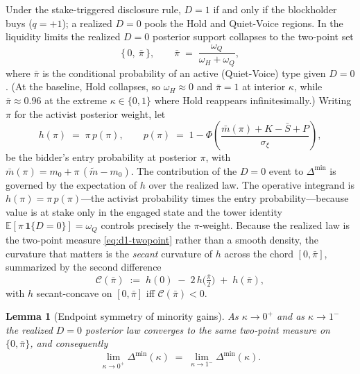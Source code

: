 \documentclass[11pt]{article}
\newtheorem{lemma}{Lemma}
\newcommand{\E}{\mathbb{E}}
\newcommand{\1}{\mathbf{1}}
\begin{document}
Under the stake-triggered disclosure rule, $D=1$ if and only if the blockholder
buys ($q=+1$); a realized $D=0$ pools the Hold and Quiet-Voice regions. In the
liquidity limits the realized $D=0$ posterior support collapses to the two-point
set
\begin{equation}
  \big\{\,0,\ \bar\pi\,\big\},
  \qquad
  \bar\pi \;=\; \frac{\omega_Q}{\omega_H+\omega_Q},
  \label{eq:d1-twopoint}
\end{equation}
where $\bar\pi$ is the conditional probability of an active (Quiet-Voice) type
given $D=0$. (At the baseline, Hold collapses, so $\omega_H\!\approx\!0$ and
$\bar\pi=1$ at interior $\kappa$, while $\bar\pi\approx 0.96$ at the extreme
$\kappa\in\{0,1\}$ where Hold reappears infinitesimally.) Writing $\pi$ for the
activist posterior weight, let
\begin{equation}
  h(\pi)\;=\;\pi\,p(\pi),
  \qquad
  p(\pi)\;=\;1-\Phi\!\left(\frac{\bar m(\pi)+K-\bar S+P}{\sigma_\xi}\right),
  \label{eq:d1-hdef}
\end{equation}
be the bidder's entry probability at posterior $\pi$, with
$\bar m(\pi)=m_0+\pi\,(\tilde m-m_0)$. The contribution of the $D=0$ event to
$\Delta^{\min}$ is governed by the expectation of $h$ over the realized law.
The operative integrand is $h(\pi)=\pi\,p(\pi)$---the activist probability times
the entry probability---because value is at stake only in the engaged state and
the tower identity $\E[\pi\,\1\{D=0\}]=\omega_Q$ controls precisely the
$\pi$-weight. Because the realized law is the two-point measure
\eqref{eq:d1-twopoint} rather than a smooth density, the curvature that matters
is the \emph{secant} curvature of $h$ across the chord $[0,\bar\pi]$, summarized
by the second difference
\begin{equation}
  \mathcal{C}(\bar\pi)
  \;:=\;
  h(0)\;-\;2\,h\!\big(\tfrac{\bar\pi}{2}\big)\;+\;h(\bar\pi),
  \label{eq:d1-chord}
\end{equation}
with $h$ secant-concave on $[0,\bar\pi]$ iff $\mathcal{C}(\bar\pi)<0$.

\begin{lemma}[Endpoint symmetry of minority gains]
\label{lem:endpoints}
As $\kappa\to 0^{+}$ and as $\kappa\to 1^{-}$ the realized $D=0$ posterior law
converges to the \emph{same} two-point measure on $\{0,\bar\pi\}$, and
consequently
\begin{equation}
  \lim_{\kappa\to 0^{+}}\Delta^{\min}(\kappa)
  \;=\;
  \lim_{\kappa\to 1^{-}}\Delta^{\min}(\kappa).
  \label{eq:d1-symmetry}
\end{equation}
\end{lemma}
\end{document}
